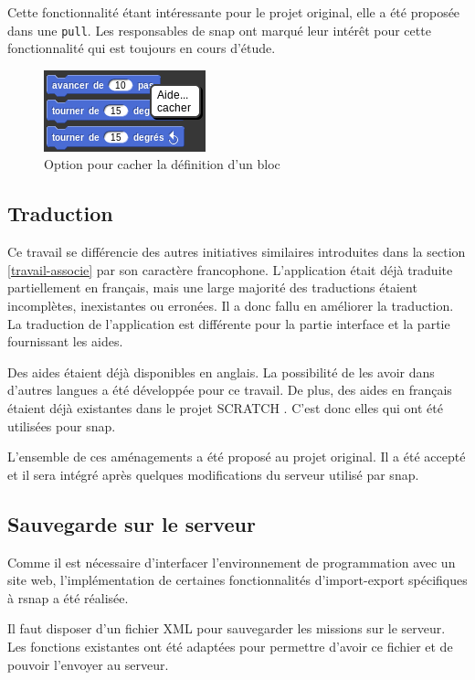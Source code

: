 Cette fonctionnalité étant intéressante pour le projet original, elle a été proposée dans une \texttt{\gls{pull}}. Les responsables de \gls{snap} ont marqué leur intérêt pour cette fonctionnalité qui est toujours en cours d'étude.
\begin{figure}
  \begin{center}
    \includegraphics[scale=0.5]{content/7-solution/2-snap/images/cacher}
    \caption{Option pour cacher la définition d'un bloc}
    \label{fig:cacher}
  \end{center}
\end{figure}

\subsection{Traduction}
Ce travail se différencie des autres initiatives similaires introduites dans la section \ref{travail-associe} par son caractère francophone. L'application était déjà traduite partiellement en français, mais une large majorité des traductions étaient incomplètes, inexistantes ou erronées. Il a donc fallu en améliorer la traduction. La traduction de l'application est différente pour la partie interface et la partie fournissant les aides.

Des aides étaient déjà disponibles en anglais. La possibilité de les avoir dans d'autres langues a été développée pour ce travail. De plus, des aides en français étaient déjà existantes dans le projet SCRATCH \cite{scratch-translation}. C'est donc elles qui ont été utilisées pour \gls{snap}.

L'ensemble de ces aménagements a été proposé au projet original. Il a été accepté et il sera intégré après quelques modifications du serveur utilisé par \gls{snap}.

\subsection{Sauvegarde sur le serveur}
\label{save-server}
Comme il est nécessaire d'interfacer l'environnement de programmation avec un site web, l'implémentation de certaines fonctionnalités d'import-export spécifiques à \gls{rsnap} a été réalisée.

Il faut disposer d'un fichier XML pour sauvegarder les \glspl{mission} sur le serveur. Les fonctions existantes ont été adaptées pour permettre d'avoir ce fichier et de pouvoir l'envoyer au serveur.
